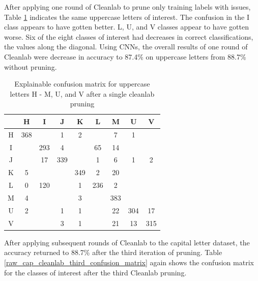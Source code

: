 \documentclass[conference]{IEEEtran}
\begin{document}
After applying one round of Cleanlab to prune only training labels with issues,
Table \ref{raw_cap_cleanlab_confusion_matrix} indicates the same uppercase
letters of interest. The confusion in the I class appears to have gotten better.
L, U, and V classes appear to have gotten worse. Six of the eight classes of
interest had decreases in correct classifications, the values along the
diagonal.  Using CNNs, the overall results of one round of Cleanlab were
decrease in accuracy to 87.4\% on uppercase letters from 88.7\% without pruning.

\begin{table}
    \centering
    \caption{Explainable confusion matrix for uppercase letters H - M, U, and V after a single cleanlab pruning}
    \begin{tabular}{ |c|c|c|c|c|c|c|c|c|}
    \hline
    ~ & H & I & J & K & L & M & U & V \\
    \hline
    H & 368 & & 1 & 2 & & 7 & 1 & \\
    \hline
    I &  & 293 & 4 &  & 65 & 14 & & \\
    \hline
    J & & 17 & 339 & & 1 & 6 & 1 & 2 \\
    \hline
    K & 5 &  &  & 349 & 2 & 20 &  & \\
    \hline
    L & 0 & 120 &  & 1 & 236 & 2 & & \\
    \hline
    M & 4 & & & 3 & & 383 & & \\
    \hline
    U & 2 & & 1 & 1 & & 22 & 304 & 17 \\
    \hline
    V & & & 3 & 1 & & 21 & 13 & 315 \\
    \hline
    \end{tabular}
    \label{raw_cap_cleanlab_confusion_matrix}
\end{table}

After applying subsequent rounds of Cleanlab to the capital letter dataset, the
accuracy returned to 88.7\% after the third iteration of pruning. Table
\ref{raw_cap_cleanlab_third_confusion_matrix} again shows the confusion matrix
for the classes of interest after the third Cleanlab pruning.
\end{document}
